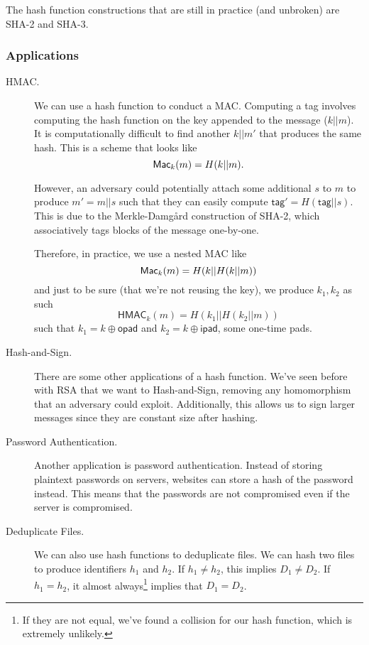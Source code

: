 The hash function constructions that are still in practice (and unbroken) are SHA-2 and SHA-3. 

\subsubsection{Applications}

\begin{description}
    \item[HMAC.] We can use a hash function to conduct a MAC. Computing a tag involves computing the hash function on the key appended to the message ($k||m$). It is computationally difficult to find another $k || m'$ that produces the same hash. This is a scheme that looks like
        \[\operatorname{\mathsf{Mac}}_k(m) = H(k||m).\]

        However, an adversary could potentially attach some additional $s$ to $m$ to produce $m' = m||s$ such that they can easily compute $\mathsf{tag}' = H(\mathsf{tag}||s)$. This is due to the Merkle-Damgård construction of SHA-2, which associatively tags blocks of the message one-by-one.


        Therefore, in practice, we use a nested MAC like
        \[\operatorname{\mathsf{Mac}}_k(m) = H(k||H(k||m))\]
        and just to be sure (that we're not reusing the key), we produce $k_1, k_2$ as such
        \[\mathsf{HMAC}_k(m) = H(k_1||H(k_2||m))\]
        such that $k_1 = k\oplus \mathsf{opad}$ and $k_2 = k\oplus\mathsf{ipad}$, some one-time pads.

    \item[Hash-and-Sign.] There are some other applications of a hash function. We've seen before with RSA that we want to Hash-and-Sign, removing any homomorphism that an adversary could exploit. Additionally, this allows us to sign larger messages since they are constant size after hashing.

    \item[Password Authentication.] Another application is password authentication. Instead of storing plaintext passwords on servers, websites can store a hash of the password instead. This means that the passwords are not compromised even if the server is compromised.

    \item[Deduplicate Files.] We can also use hash functions to deduplicate files. We can hash two files to produce identifiers $h_1$ and $h_2$. If $h_1\neq h_2$, this implies $D_1\neq D_2$. If $h_1 = h_2$, it almost always\footnote{If they are not equal, we've found a collision for our hash function, which is extremely unlikely.} implies that $D_1 = D_2$.


\end{description}
